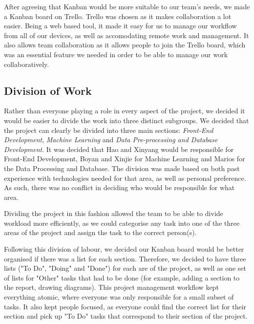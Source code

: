\documentclass[titlepage]{article}
\begin{document}
After agreeing that Kanban would be more suitable to our team's needs, we made a Kanban board on Trello. Trello was chosen as it makes collaboration a lot easier. Being a web based tool, it made it easy for us to manage our workflow from all of our devices, as well as accomodating remote work and management. It also allows team collaboration as it allows people to join the Trello board, which was an essential feature we needed in order to be able to manage our work collaboratively.

\subsection{Division of Work}
Rather than everyone playing a role in every aspect of the project, we decided it would be easier to divide the work into three distinct subgroups. We decided that the project can clearly be divided into three main sections: \textit{Front-End Development}, \textit{Machine Learning} and \textit{Data Pre-processing and Database Development}. It was decided that Hao and Xinyang would be responsible for Front-End Development, Boyan and Xinjie for Machine Learning and Marios for the Data Processing and Database. The division was made based on both past experience with technologies needed for that area, as well as personal preference. As such, there was no conflict in deciding who would be responsible for what area.

Dividing the project in this fashion allowed the team to be able to divide workload more efficiently, as we could categorise any task into one of the three areas of the project and assign the task to the correct person(s).

Following this division of labour, we decided our Kanban board would be better organised if there was a list for each section. Therefore, we decided to have three lists ("To Do", "Doing" and "Done") for each are of the project, as well as one set of lists for "Other" tasks that had to be done (for example, adding a section to the report, drawing diagrams). This project management workflow kept everything atomic, where everyone was only responsible for a small subset of tasks. It also kept people focused, as everyone could find the correct list for their section and pick up "To Do" tasks that correspond to their section of the project.

\pagebreak
{}
 
\end{document}
